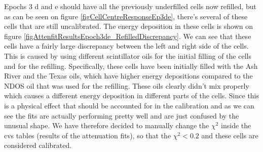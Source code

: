 \documentclass[12pt,a4paper]{article}
\begin{document}
Epochs 3 d and e should have all the previously underfilled cells now refilled, but as can be seen on figure \ref{figCellCentreResponseEp3de}, there's several of these cells that are still uncalibrated. The energy deposition in these cells is shown on figure \ref{figAttenfitResultsEpoch3de_RefilledDiscrepancy}. We can see that these cells have a fairly large discrepancy between the left and right side of the cells. This is caused by using different scintillator oils for the initial filling of the cells and for the refilling. Specifically, these cells have been initially filled with the Ash River and the Texas oils, which have higher energy depositions compared to the NDOS oil that was used for the refilling. These oils clearly didn't mix properly which causes a different energy deposition in different parts of the cells. Since this is a physical effect that should be accounted for in the calibration and as we can see the fits are actually performing pretty well and are just confused by the unusual shape. We have therefore decided to manually change the $\chi^2$ inside the cvs tables (results of the attenuation fits), so that the $\chi^2<0.2$ and these cells are considered calibrated.
\end{document}
